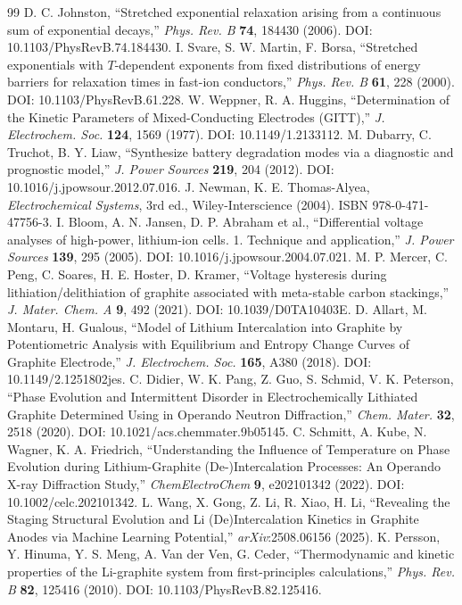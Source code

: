 \documentclass[11pt,a4paper]{article}
\begin{document}
\begin{thebibliography}{99}
 D. C. Johnston, ``Stretched exponential relaxation arising from a continuous sum of exponential decays,'' \emph{Phys. Rev. B} \textbf{74}, 184430 (2006). DOI: 10.1103/PhysRevB.74.184430.
 I. Svare, S. W. Martin, F. Borsa, ``Stretched exponentials with $T$-dependent exponents from fixed distributions of energy barriers for relaxation times in fast-ion conductors,'' \emph{Phys. Rev. B} \textbf{61}, 228 (2000). DOI: 10.1103/PhysRevB.61.228.
 W. Weppner, R. A. Huggins, ``Determination of the Kinetic Parameters of Mixed-Conducting Electrodes (GITT),'' \emph{J. Electrochem. Soc.} \textbf{124}, 1569 (1977). DOI: 10.1149/1.2133112.
 M. Dubarry, C. Truchot, B. Y. Liaw, ``Synthesize battery degradation modes via a diagnostic and prognostic model,'' \emph{J. Power Sources} \textbf{219}, 204 (2012). DOI: 10.1016/j.jpowsour.2012.07.016.
 J. Newman, K. E. Thomas-Alyea, \emph{Electrochemical Systems}, 3rd ed., Wiley-Interscience (2004). ISBN 978-0-471-47756-3.
 I. Bloom, A. N. Jansen, D. P. Abraham et al., ``Differential voltage analyses of high-power, lithium-ion cells. 1. Technique and application,'' \emph{J. Power Sources} \textbf{139}, 295 (2005). DOI: 10.1016/j.jpowsour.2004.07.021.
 M. P. Mercer, C. Peng, C. Soares, H. E. Hoster, D. Kramer, ``Voltage hysteresis during lithiation/delithiation of graphite associated with meta-stable carbon stackings,'' \emph{J. Mater. Chem. A} \textbf{9}, 492 (2021). DOI: 10.1039/D0TA10403E.
 D. Allart, M. Montaru, H. Gualous, ``Model of Lithium Intercalation into Graphite by Potentiometric Analysis with Equilibrium and Entropy Change Curves of Graphite Electrode,'' \emph{J. Electrochem. Soc.} \textbf{165}, A380 (2018). DOI: 10.1149/2.1251802jes.
 C. Didier, W. K. Pang, Z. Guo, S. Schmid, V. K. Peterson, ``Phase Evolution and Intermittent Disorder in Electrochemically Lithiated Graphite Determined Using in Operando Neutron Diffraction,'' \emph{Chem. Mater.} \textbf{32}, 2518 (2020). DOI: 10.1021/acs.chemmater.9b05145.
 C. Schmitt, A. Kube, N. Wagner, K. A. Friedrich, ``Understanding the Influence of Temperature on Phase Evolution during Lithium-Graphite (De-)Intercalation Processes: An Operando X-ray Diffraction Study,'' \emph{ChemElectroChem} \textbf{9}, e202101342 (2022). DOI: 10.1002/celc.202101342.
 L. Wang, X. Gong, Z. Li, R. Xiao, H. Li, ``Revealing the Staging Structural Evolution and Li (De)Intercalation Kinetics in Graphite Anodes via Machine Learning Potential,'' \emph{arXiv}:2508.06156 (2025).
 K. Persson, Y. Hinuma, Y. S. Meng, A. Van der Ven, G. Ceder, ``Thermodynamic and kinetic properties of the Li-graphite system from first-principles calculations,'' \emph{Phys. Rev. B} \textbf{82}, 125416 (2010). DOI: 10.1103/PhysRevB.82.125416.
\end{thebibliography}
\end{document}
